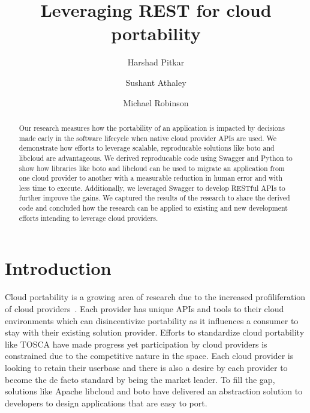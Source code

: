% 
\title{Leveraging REST for cloud portability}

\author{Harshad Pitkar}

\author{Sushant Athaley}

\author{Michael Robinson}


\renewcommand{\shortauthors}{H. Pitkar, S. Athaley, M. Robinson}


\begin{abstract}
Our research measures how the portability of an application is impacted by
decisions made early in the software lifecycle when native cloud provider APIs
are used. We demonstrate how efforts to leverage scalable, reproducable
solutions like boto and libcloud are advantageous. We derived reproducable code
using Swagger and Python to show how libraries like boto and libcloud can be 
used to migrate an application from one cloud provider to another with a
measurable reduction in human error and with less  time to execute.
Additionally, we leveraged Swagger to develop RESTful APIs to  further improve
the gains. We captured the results of the research to share the derived code and
concluded how the research can be applied to existing and new development
efforts intending to leverage cloud providers. 
\end{abstract}


\maketitle

\section{Introduction}\label{introduction}

Cloud portability is a growing area of research due to the increased
profiliferation of cloud providers~\cite{hid-sp18-518-Cloud-Council}. Each
provider has unique APIs and tools to their cloud environments  which can
disincentivize portability as it influences a consumer to stay with their
existing solution provider. Efforts to standardize cloud portability like TOSCA
have made progress yet participation by cloud providers is constrained due to
the competitive nature in the space. Each cloud provider is looking to retain
their userbase and there is also a desire by each provider to become the de
facto standard by being the market leader. To fill the gap, solutions like
Apache libcloud and boto have delivered an abstraction solution to developers to
design applications that are easy to port.

